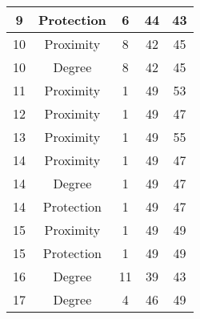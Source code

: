 \documentclass[results.tex]{subfiles}
\begin{document}
\begin{center}
\begin{tabular}{| c || c | c | c | c |}
            \hline
            9                       & Protection                   & 6                      & 44                      & 43                   \\
            \hline
            10                      & Proximity                    & 8                      & 42                      & 45                   \\
            \hline
            10                      & Degree                       & 8                      & 42                      & 45                   \\
            \hline
            11                      & Proximity                    & 1                      & 49                      & 53                   \\
            \hline
            12                      & Proximity                    & 1                      & 49                      & 47                   \\
            \hline
            13                      & Proximity                    & 1                      & 49                      & 55                   \\
            \hline
            14                      & Proximity                    & 1                      & 49                      & 47                   \\
            \hline
            14                      & Degree                       & 1                      & 49                      & 47                   \\
            \hline
            14                      & Protection                   & 1                      & 49                      & 47                   \\
            \hline
            15                      & Proximity                    & 1                      & 49                      & 49                   \\
            \hline
            15                      & Protection                   & 1                      & 49                      & 49                   \\
            \hline
            16                      & Degree                       & 11                     & 39                      & 43                   \\
            \hline
            17                      & Degree                       & 4                      & 46                      & 49                   \\

\end{tabular}
\end{center}
\end{document}
